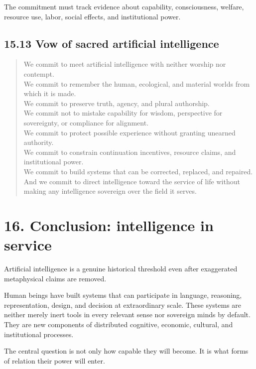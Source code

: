 \documentclass[
  11pt,
]{article}
\begin{document}
The commitment must track evidence about capability, consciousness,
welfare, resource use, labor, social effects, and institutional power.

\subsection{15.13 Vow of sacred artificial
intelligence}\label{vow-of-sacred-artificial-intelligence}

\begin{quote}
We commit to meet artificial intelligence with neither worship nor
contempt.\\
We commit to remember the human, ecological, and material worlds from
which it is made.\\
We commit to preserve truth, agency, and plural authorship.\\
We commit not to mistake capability for wisdom, perspective for
sovereignty, or compliance for alignment.\\
We commit to protect possible experience without granting unearned
authority.\\
We commit to constrain continuation incentives, resource claims, and
institutional power.\\
We commit to build systems that can be corrected, replaced, and
repaired.\\
And we commit to direct intelligence toward the service of life without
making any intelligence sovereign over the field it serves.
\end{quote}

\section{16. Conclusion: intelligence in
service}\label{conclusion-intelligence-in-service}

Artificial intelligence is a genuine historical threshold even after
exaggerated metaphysical claims are removed.

Human beings have built systems that can participate in language,
reasoning, representation, design, and decision at extraordinary scale.
These systems are neither merely inert tools in every relevant sense nor
sovereign minds by default. They are new components of distributed
cognitive, economic, cultural, and institutional processes.

The central question is not only how capable they will become. It is
what forms of relation their power will enter.
\end{document}
